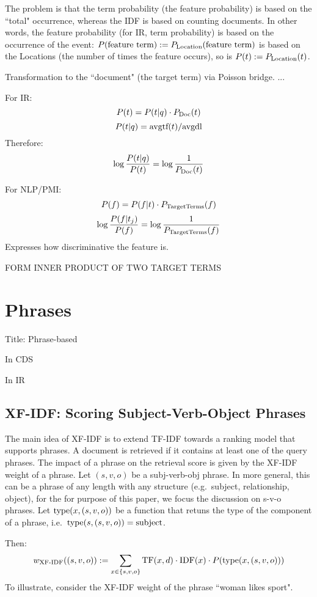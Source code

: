 The problem is that the term probability (the feature probability)
is based on the ``total" occurrence, whereas the IDF is based
on counting documents.
In other words,
the feature probability (for IR, term probability) is based on
the occurrence of the event:
$P(\textmd{feature term}):=P_{\textmd{Location}}(\textmd{feature term})$
is based on the Locations (the number of times the feature occurs), so is
$P(t):=P_{\textmd{Location}}(t)$.

Transformation to the ``document" (the target term) via Poisson bridge.
...

For IR:
\[
P(t) = P(t|q) \cdot P_{\textmd{Doc}}(t)
\]
\[
P(t|q) = \textmd{avgtf}(t) / \textmd{avgdl}
\]
Therefore:
\[
\log\frac{P(t|q)}{P(t)} = \log\frac{1}{P_{\textmd{Doc}}(t)}
\]

For NLP/PMI:
\[
P(f) = P(f|t) \cdot P_\textmd{TargetTerms}(f)
\]
\[
\log\frac{P(f|t_j)}{P(f)} = \log\frac{1}{P_\textmd{TargetTerms}(f)}
\]
Expresses how discriminative the feature is.


FORM INNER PRODUCT OF TWO TARGET TERMS


\section{Phrases}

Title: Phrase-based


In CDS


In IR


\subsection{XF-IDF: Scoring Subject-Verb-Object Phrases}

The main idea of XF-IDF \cite{Azzam/etal:SIGMOD:KEYS:2010} is to extend
TF-IDF towards a ranking model that supports phrases.
%
A document is retrieved if it contains at least one of the query phrases.
%
The impact of a phrase on the retrieval score is given by the XF-IDF
weight of a phrase.
%
Let $(s,v,o)$ be a subj-verb-obj phrase.
In more general, this can be a phrase of any length with any structure
(e.g.~subject, relationship, object), for the for purpose of this paper,
we focus the discussion on s-v-o phrases.
%
Let $\textmd{type}(x,(s,v,o))$ be a function that retuns the type of the component
of a phrase, i.e.~$\textmd{type}(s,(s,v,o))=\textmd{subject}$.

Then:
\[
w_\textmd{XF-IDF}((s,v,o)) :=
\sum_{x \in \{s,v,o\}} \textmd{TF}(x,d) \cdot \textmd{IDF}(x) \cdot P(\textmd{type}(x,(s,v,o)))
\]
To illustrate, consider the XF-IDF weight of the phrase ``woman likes sport".

